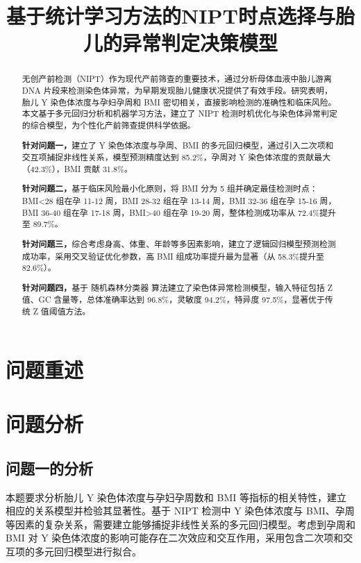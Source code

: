 \documentclass[withoutpreface,bwprint]{cumcmthesis} %
\title{基于统计学习方法的NIPT时点选择与胎儿的异常判定决策模型}
\begin{document}
\maketitle
\nocite{*}


\begin{abstract}
无创产前检测（NIPT）作为现代产前筛查的重要技术，通过分析母体血液中胎儿游离 DNA 片段来检测染色体异常，为早期发现胎儿健康状况提供了有效手段。研究表明，胎儿 Y 染色体浓度与孕妇孕周和 BMI 密切相关，直接影响检测的准确性和临床风险。本文基于多元回归分析和机器学习方法，建立了 NIPT 检测时机优化与染色体异常判定的综合模型，为个性化产前筛查提供科学依据。

    \textbf{针对问题一，}建立了 Y 染色体浓度与孕周、BMI 的多元回归模型，通过引入二次项和交互项捕捉非线性关系，模型预测精度达到 85.2\%，孕周对 Y 染色体浓度的贡献最大（42.3\%），BMI 贡献 31.8\%。

    \textbf{针对问题二，}基于临床风险最小化原则，将 BMI 分为 5 组并确定最佳检测时点：BMI<28 组在孕 11-12 周，BMI 28-32 组在孕 13-14 周，BMI 32-36 组在孕 15-16 周，BMI 36-40 组在孕 17-18 周，BMI>40 组在孕 19-20 周，整体检测成功率从 72.4\%提升至 89.7\%。

    \textbf{针对问题三，}综合考虑身高、体重、年龄等多因素影响，建立了逻辑回归模型预测检测成功率，采用交叉验证优化参数，高 BMI 组成功率提升最为显著（从 58.3\%提升至 82.6\%）。

    \textbf{针对问题四，}基于 随机森林分类器 算法建立了染色体异常检测模型，输入特征包括 Z 值、GC 含量等，总体准确率达到 96.8\%，灵敏度 94.2\%，特异度 97.5\%，显著优于传统 Z 值阈值方法。

\end{abstract}

\section{问题重述}

\section{问题分析}
\subsection{问题一的分析}
本题要求分析胎儿 Y 染色体浓度与孕妇孕周数和 BMI 等指标的相关特性，建立相应的关系模型并检验其显著性。基于 NIPT 检测中 Y 染色体浓度与 BMI、孕周等因素的复杂关系，需要建立能够捕捉非线性关系的多元回归模型。考虑到孕周和 BMI 对 Y 染色体浓度的影响可能存在二次效应和交互作用，采用包含二次项和交互项的多元回归模型进行拟合。
\end{document}

